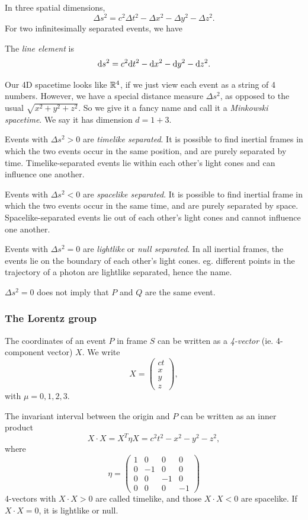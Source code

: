 \documentclass[a4paper]{article}
\begin{document}
In three spatial dimensions,
\[
  \Delta s^2 = c^2\Delta t^2 - \Delta x^2 - \Delta y^2 - \Delta z^2.
\]
For two infinitesimally separated events, we have 
\begin{defi}
  The \emph{line element} is
  \[
    \mathrm{d} s^2 = c^2 \mathrm{d} t^2 - \mathrm{d} x^2 - \mathrm{d} y^2 - \mathrm{d} z^2.
  \]
\end{defi}
Our 4D spacetime looks like $\mathbb{R}^4$, if we just view each event as a string of 4 numbers. However, we have a special distance measure $\Delta s^2$, as opposed to the usual $\sqrt{x^2 + y^2 + z^2}$. So we give it a fancy name and call it a \emph{Minkowski spacetime}. We say it has dimension $d = 1 + 3$.

\begin{defi}
  Events with $\Delta s^2 > 0$ are \emph{timelike separated}. It is possible to find inertial frames in which the two events occur in the same position, and are purely separated by time. Timelike-separated events lie within each other's light cones and can influence one another.

  Events with $\Delta s^2 < 0$ are \emph{spacelike separated}. It is possible to find inertial frame in which the two events occur in the same time, and are purely separated by space. Spacelike-separated events lie out of each other's light cones and cannot influence one another.

  Events with $\Delta s^2 = 0$ are \emph{lightlike} or \emph{null separated}. In all inertial frames, the events lie on the boundary of each other's light cones. eg. different points in the trajectory of a photon are lightlike separated, hence the name.
\end{defi}
\note $\Delta s^2 = 0$ does not imply that $P$ and $Q$ are the same event.

\subsubsection{The Lorentz group}
The coordinates of an event $P$ in frame $S$ can be written as a \emph{4-vector} (ie. 4-component vector) $X$. We write
\[
  X =
  \begin{pmatrix}
    ct\\
    x\\
    y\\
    z
  \end{pmatrix},
\]
with $\mu = 0, 1, 2, 3$.

The invariant interval between the origin and $P$ can be written as an inner product
\[
  X\cdot X = X^T\eta X = c^2t^2  - x^2 - y^2 - z^2,
\]
where
\[
  \eta =
  \begin{pmatrix}
    1 & 0 & 0 & 0\\
    0 & -1 & 0 & 0\\
    0 & 0 & -1 & 0\\
    0 & 0 & 0 & -1
  \end{pmatrix}
\]
4-vectors with $X\cdot X > 0$ are called timelike, and those $X \cdot X < 0$ are spacelike. If $X\cdot X = 0$, it is lightlike or null.
\end{document}
